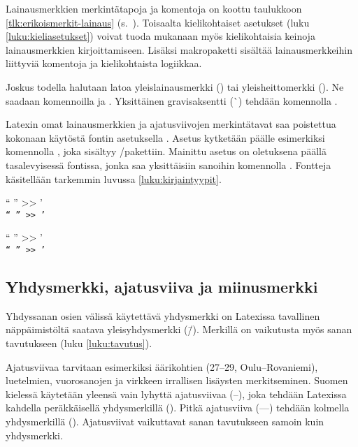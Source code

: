 Lainausmerkkien merkintätapoja ja komentoja on koottu taulukkoon
\ref{tlk:erikoismerkit-lainaus}
(s.~\pageref{tlk:erikoismerkit-lainaus}). Toisaalta kielikohtaiset
asetukset (luku \ref{luku:kieliasetukset}) voivat tuoda mukanaan myös
kielikohtaisia keinoja lainausmerkkien kirjoittamiseen. Lisäksi
makropaketti  sisältää
lainausmerkkeihin liittyviä komentoja ja kielikohtaista logiikkaa.

Joskus todella halutaan latoa yleislainausmerkki (\textquotedbl) tai
yleisheittomerkki (\textquotesingle). Ne saadaan komennoilla
 ja .
Yksittäinen gra\-vis\-ak\-sent\-ti (\`{}) tehdään komennolla
.

Latexin omat lainausmerkkien ja ajatusviivojen merkintätavat saa
poistettua kokonaan käytöstä fontin asetuksella
. Asetus kytketään päälle esimerkiksi
komennolla , joka sisältyy
\-/pakettiin. Mainittu asetus on oletuksena päällä
tasalevyisessä fontissa, jonka saa yksittäisiin sanoihin komennolla
. Fontteja käsitellään tarkemmin luvussa
\ref{luku:kirjaintyypit}.

\pagebreak[3]

\begin{koodilohkosis}
  { `` '' >> '} \\
  \texttt{`` '' >> '}
\end{koodilohkosis}

\begin{tulossis}
  { `` '' >> '} \\
  \texttt{`` '' >> '}
\end{tulossis}

\subsection{Yhdysmerkki, ajatusviiva ja miinusmerkki}

Yhdyssanan osien välissä käytettävä yhdysmerkki on Latexissa tavallinen
näppäimistöltä saatava yleis\-yh\-dys\-merk\-ki (\=/). Merkillä on
vaikutusta myös sanan tavutukseen (luku \ref{luku:tavutus}).

Ajatusviivaa tarvitaan esimerkiksi äärikohtien (27--29,
Oulu--Rova\-niemi), luetelmien, vuorosanojen ja virkkeen irrallisen
lisäysten merkitseminen. Suomen kielessä käytetään yleensä vain lyhyttä
ajatusviivaa \mbox{(--)}, joka tehdään Latexissa kahdella peräkkäisellä
yhdysmerkillä \mbox{(\koodi{--})}. Pitkä ajatusviiva \mbox{(---)}
tehdään kolmella yhdysmerkillä \mbox{(\koodi{---})}. Ajatusviivat
vaikuttavat sanan tavutukseen samoin kuin yhdysmerkki.

